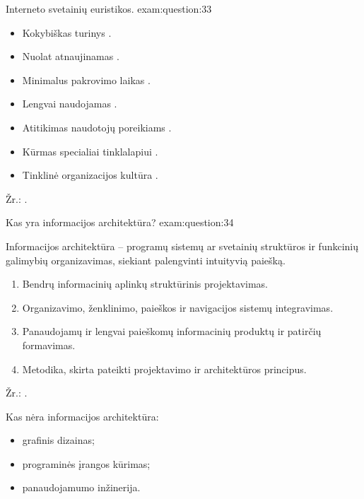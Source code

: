 \begin{question}{%
  Interneto svetainių euristikos.
  }{exam:question:33}
  \begin{itemize}
    \item Kokybiškas turinys .
    \item Nuolat atnaujinamas .
    \item Minimalus pakrovimo laikas .
    \item Lengvai naudojamas .
    \item Atitikimas naudotojų poreikiams .
    \item Kūrmas specialiai tinklalapiui .
    \item Tinklinė organizacijos kultūra .
  \end{itemize}
  Žr.: \cite[37]{skaidres-13}.
\end{question}

\begin{question}{%
  Kas yra informacijos architektūra?
  }{exam:question:34}

  Informacijos architektūra\cite[11]{skaidres-14} – programų sistemų
  ar svetainių struktūros ir funkcinių galimybių organizavimas, siekiant
  palengvinti intuityvią paiešką.

  \begin{enumerate}
    \item Bendrų informacinių aplinkų struktūrinis projektavimas.
    \item Organizavimo, ženklinimo, paieškos ir navigacijos sistemų
      integravimas.
    \item Panaudojamų ir lengvai paieškomų informacinių produktų
      ir patirčių formavimas.
    \item Metodika, skirta pateikti projektavimo ir architektūros
      principus.
  \end{enumerate}
  Žr.: \cite[8]{skaidres-14}.

  Kas nėra informacijos architektūra\cite[12]{skaidres-14}:
  \begin{itemize}
    \item grafinis dizainas;
    \item programinės įrangos kūrimas;
    \item panaudojamumo inžinerija.
  \end{itemize}
\end{question}

